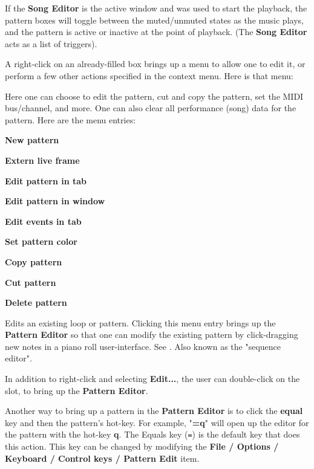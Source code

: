    If the \textbf{Song Editor} is the active window and was used to
   start the playback, the pattern boxes will toggle between the muted/unmuted
   states as the music plays, and the pattern is active or inactive at the
   point of playback.  (The \textbf{Song Editor} acts as a list of triggers).

   A right-click on an already-filled box brings up a menu
   to allow one to edit it, or perform a few other actions
   specified in the context menu.  Here is that menu:

   Here one can choose to edit the pattern, cut and copy the pattern,
   set the MIDI bus/channel, and more.
   One can also clear all performance (song) data for the pattern.
   Here are the menu entries:
   
   \begin{enumber}
      \item \textbf{New pattern}
      \item \textbf{Extern live frame}
      \item \textbf{Edit pattern in tab}
      \item \textbf{Edit pattern in window}
      \item \textbf{Edit events in tab}
      \item \textbf{Set pattern color}
      \item \textbf{Copy pattern}
      \item \textbf{Cut pattern}
      \item \textbf{Delete pattern}
   \end{enumber}

   \setcounter{ItemCounter}{0}      %

   Edits an existing loop or pattern.
   Clicking this menu entry brings up the \textbf{Pattern Editor}
   so that one can modify the existing pattern by click-dragging new notes in a
   piano roll user-interface.
   See .
   Also known as the "sequence editor".

   In addition to right-click and selecting \textbf{Edit...}, the user can
   double-click on the slot, to bring up the \textbf{Pattern Editor}.

   Another way to bring up a pattern in the 
   \textbf{Pattern Editor} is to
   click the \textbf{equal} key and then the pattern's hot-key.
   For example, "\textbf{=q}" will open up the editor for the pattern with the
   hot-key \textbf{q}.
   The Equals key (\texttt{=}) is the default key that does this action.
   This key can be changed by modifying the
   \textbf{File / Options / Keyboard / Control keys / Pattern Edit} item.


